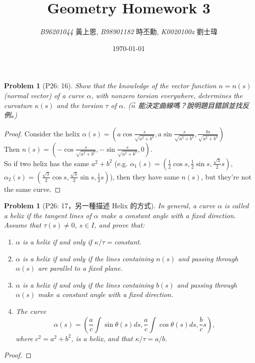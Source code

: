 \documentclass[10pt,a4paper]{article}
\newcommand{\LiHei}{\CJKfamily{lh}}
\newcounter{theProblemCounter}
\newtheorem{problem}[theProblemCounter]{Problem}
\begin{document}
\title{{Geometry Homework 3}}
\author{{\it{B96201044}} {\LiHei 黃上恩}, {\it{B98901182}} {\LiHei 時丕勳}, {\it{K0020100x}} {\LiHei 劉士瑋}}
\date{\today}
\maketitle

\setcounter{theProblemCounter}{2}
\begin{problem}[P26: 16]
Show that the knowledge of the vector function $n=n(s)$ (normal vector) of a curve $\alpha$, with nonzero torsion everywhere, determines the curvature $\kappa(s)$ and the torsion $\tau$ of $\alpha$.  ($\vec{n}$ 能決定曲線嗎？說明題目錯誤並找反例。)
\end{problem}
\begin{proof}
Consider the helix $\alpha(s)=(a\cos{\frac{s}{\sqrt{a^2+b^2}}},a\sin{\frac{s}{\sqrt{a^2+b^2}}},{\frac{bs}{\sqrt{a^2+b^2}}})$\\
Then $n(s)=(-\cos{\frac{s}{\sqrt{a^2+b^2}}},-\sin{\frac{s}{\sqrt{a^2+b^2}}},0)$.\\
So if two helix has the same $a^2+b^2$ (e.g. $\alpha_1(s)=(\frac{1}{2}\cos{s},\frac{1}{2}\sin{s},\frac{\sqrt{3}}{2}s)$, $\alpha_2(s)=(\frac{\sqrt{3}}{2}\cos{s},\frac{\sqrt{3}}{2}\sin{s},\frac{1}{2}s)$), then they have same $n(s)$, but they're not the same curve.
\end{proof}

\setcounter{theProblemCounter}{3}
\begin{problem}[P26: 17，另一種描述 Helix 的方式]
In general, a curve $\alpha$ is called a \emph{helix} if the tangent lines of $\alpha$ make a constant angle with a fixed direction. Assume that $\tau(s)\ne 0$, $s\in I$, and prove that:
\begin{enumerate}
\item[(a)] $\alpha$ is a helix if and only if $\kappa/\tau=$constant.
\item[(b)] $\alpha$ is a helix if and only if the lines containing $n(s)$ and passing through $\alpha(s)$ are parallel to a fixed plane.
\item[(c)] $\alpha$ is a helix if and only if the lines containing $b(s)$ and passing through $\alpha(s)$ make a constant angle with a fixed direction.
\item[(d)] The curve\[
\alpha(s)=\left(\frac{a}{c}\int \sin\theta(s) ds, \frac{a}{c}\int \cos\theta(s) ds, \frac{b}{c} s
\right),
\]
where $c^2=a^2+b^2$, is a helix, and that $\kappa/\tau=a/b$.
\end{enumerate}
\end{problem}
\begin{proof}

\end{proof}
\end{document}
